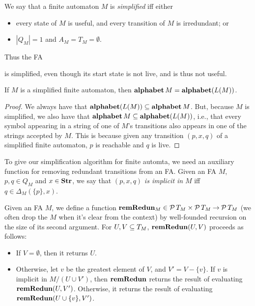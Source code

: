 We say that a finite automaton $M$ is \emph{simplified} iff either
%
%
%
\begin{itemize}
\item every state of $M$ is useful, and every transition of $M$
  is irredundant; or

\item $|Q_M|=1$ and $A_M = T_M = \emptyset$.
\end{itemize}
Thus the FA
\begin{center}

\end{center}
is simplified, even though its start state is not live, and is
thus not useful.

\begin{proposition}
\label{AlphabetSimplifiedFA}
If $M$ is a simplified finite automaton, then
$\mathbf{alphabet}\,M=\mathbf{alphabet}(L(M))$.
\end{proposition}

\begin{proof}
We always have that $\mathbf{alphabet}(L(M))\subseteq\mathbf{alphabet}\,M$.  But, because $M$
is simplified, we also have that $\mathbf{alphabet}\,M\subseteq\mathbf{alphabet}(L(M))$,
i.e., that every symbol appearing in a string of one of $M$'s
transitions also appears in one of the strings accepted by $M$.
This is because given any transition $(p,x,q)$ of a simplified
finite automaton, $p$ is reachable and $q$ is live.
\end{proof}

To give our simplification algorithm for finite automta, we need an
auxiliary function for removing redundant transitions from an FA.
Given an FA $M$, $p,q\in Q_M$ and $x\in\mathbf{Str}$, we say that $(p,x,q)$
\emph{is implicit in} $M$ iff $q\in\Delta_M(\{p\},x)$.

Given an FA $M$, we define a function
$\mathbf{remRedun}_M\in{\cal P} \,T_M\times{\cal P} \,T_M\mathbin{\to}{\cal P} \,T_M$ (we
often drop the $M$ when it's clear from the context) by well-founded
recursion on the size of its second argument.  For $U,V\subseteq T_M$,
$\mathbf{remRedun}(U, V)$ proceeds as follows:
\begin{itemize}
\item If $V=\emptyset$, then it returns $U$.

\item Otherwise, let $v$ be the greatest element of $V$, and $V' = V -
  \{v\}$.  If $v$ is implicit in $M/(U\cup V')$, then $\mathbf{remRedun}$
  returns the result of evaluating $\mathbf{remRedun}(U, V')$.  Otherwise, it
  returns the result of evaluating $\mathbf{remRedun}(U \cup \{v\}, V')$.
\end{itemize}

